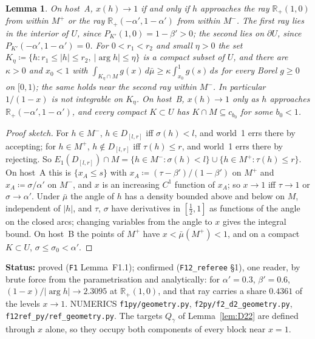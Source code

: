 \documentclass[11pt]{article}
\newtheorem{lemma}[theorem]{Lemma}
\theoremstyle{definition}
\theoremstyle{remark}
\newcommand{\R}{\mathbb R}
\newcommand{\src}[1]{\texttt{#1}}
\newcommand{\status}[1]{\par\smallskip\noindent\textbf{Status:} #1\par\smallskip}
\begin{document}
\begin{lemma}\label{lem:F11}
On host~A, $x(h)\to1$ if and only if $h$ approaches the ray $\R_+(1,0)$ from within $M^+$ or the ray $\R_+(-\alpha',1-\alpha')$ from within $M^-$. The first ray lies in the interior of $U$, since $P_{K'}(1,0)=1-\beta'>0$; the second lies on $\partial U$, since $P_{K'}(-\alpha',1-\alpha')=0$. For $0<r_1<r_2$ and small $\eta>0$ the set $K_\eta\coloneqq\{h:r_1\le|h|\le r_2,\ |\arg h|\le\eta\}$ is a compact subset of $U$, and there are $\kappa>0$ and $x_0<1$ with $\int_{K_\eta\cap M}g(x)\,d\bar\mu\ge\kappa\int_{x_0}^1g(s)\,ds$ for every Borel $g\ge0$ on $[0,1)$; the same holds near the second ray within $M^-$. In particular $1/(1-x)$ is not integrable on $K_\eta$. On host~B, $x(h)\to1$ only as $h$ approaches $\R_+(-\alpha',1-\alpha')$, and every compact $K\subset U$ has $K\cap M\subseteq c_{b_0}$ for some $b_0<1$.
\end{lemma}
\begin{proof}[Proof sketch]
For $h\in M^-$, $h\in D_{[l,r]}$ iff $\sigma(h)<l$, and world~1 errs there by accepting; for $h\in M^+$, $h\notin D_{[l,r]}$ iff $\tau(h)\le r$, and world~1 errs there by rejecting. So $E_1(D_{[l,r]})\cap M=\{h\in M^-:\sigma(h)<l\}\cup\{h\in M^+:\tau(h)\le r\}$. On host~A this is $\{x_A\le s\}$ with $x_A\coloneqq(\tau-\beta')/(1-\beta')$ on $M^+$ and $x_A\coloneqq\sigma/\alpha'$ on $M^-$, and $x$ is an increasing $C^1$ function of $x_A$; so $x\to1$ iff $\tau\to1$ or $\sigma\to\alpha'$. Under $\bar\mu$ the angle of $h$ has a density bounded above and below on $M$, independent of $|h|$, and $\tau$, $\sigma$ have derivatives in $[\frac12,1]$ as functions of the angle on the closed arcs; changing variables from the angle to $x$ gives the integral bound. On host~B the points of $M^+$ have $x<\bar\mu(M^+)<1$, and on a compact $K\subset U$, $\sigma\le\sigma_0<\alpha'$.
\end{proof}
\status{proved (\src{F1} Lemma~F1.1); confirmed (\src{F12\_referee} \S1), one reader, by brute force from the parametrisation and analytically: for $\alpha'=0.3$, $\beta'=0.6$, $(1-x)/|\arg h|\to2.3095$ at $\R_+(1,0)$, and that ray carries a share $0.4361$ of the levels $x\to1$. NUMERICS \src{f1py/geometry.py}, \src{f2py/f2\_d2\_geometry.py}, \src{f12ref\_py/ref\_geometry.py}. The targets $Q_\gamma$ of Lemma~\ref{lem:D22} are defined through $x$ alone, so they occupy both components of every block near $x=1$.}
\end{document}
